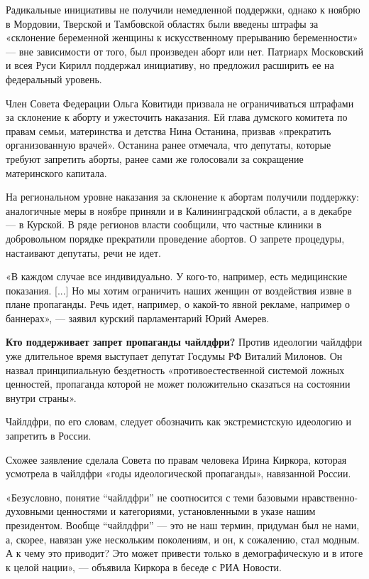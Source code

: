 Радикальные инициативы не получили немедленной поддержки,
однако к ноябрю в Мордовии, Тверской и Тамбовской областях были
введены штрафы за «склонение беременной женщины к искусственному прерыванию беременности»
--- вне зависимости от того, был произведен аборт или нет.
Патриарх Московский и всея Руси Кирилл поддержал инициативу,
но предложил расширить ее на федеральный уровень.

Член Совета Федерации Ольга Ковитиди призвала не ограничиваться
штрафами за склонение к аборту и ужесточить наказания.
Ей 
глава думского комитета по правам семьи, материнства и детства
Нина Останина, призвав «прекратить организованную
 врачей».
Останина ранее отмечала, что депутаты,
которые требуют запретить аборты,
ранее сами же голосовали за сокращение материнского капитала.

На региональном уровне наказания за склонение к абортам
получили поддержку: аналогичные меры в ноябре приняли и
в Калининградской области, а в декабре --- в Курской.
В ряде регионов власти сообщили, что частные клиники
в добровольном порядке прекратили проведение абортов.
О запрете процедуры, настаивают депутаты, речи не идет.

«В каждом случае все индивидуально.
У кого-то, например, есть медицинские показания.
[...] Но мы хотим ограничить наших женщин от воздействия
извне в плане пропаганды.
Речь идет, например, о какой-то явной рекламе,
например о баннерах», --- заявил курский парламентарий Юрий Амерев.

\textbf{Кто поддерживает запрет пропаганды чайлдфри?}
Против идеологии чайлдфри уже длительное время выступает депутат
Госдумы РФ Виталий Милонов. Он назвал принципиальную бездетность
«противоестественной системой ложных ценностей,
пропаганда которой не может положительно сказаться на состоянии
внутри страны».

Чайлдфри, по его словам, следует обозначить как экстремистскую
идеологию и запретить в России.

Схожее заявление сделала 
Совета по правам человека Ирина Киркора,
которая усмотрела в чайлдфри «годы идеологической пропаганды»,
навязанной России.

«Безусловно, понятие ``чайлдфри'' не соотносится с теми
базовыми нравственно-духовными ценностями и категориями,
установленными в указе нашим президентом.
Вообще ``чайлдфри'' --- это не наш термин, придуман был не нами,
а, скорее, навязан уже нескольким поколениям, и он,
к сожалению, стал модным.
А к чему это приводит? Это может привести только в демографическую
 и в итоге к
 целой нации»,
--- объявила Киркора в беседе с РИА Новости.

